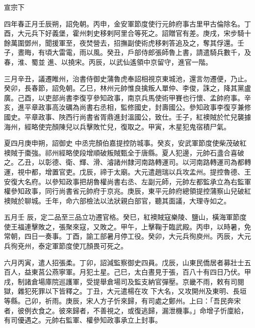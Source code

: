 
\begin{pinyinscope}

 宣宗下



 四年春正月壬辰朔，詔免朝。丙申，金安軍節度使行元帥府事古里甲古倫除名。丁酉，大元兵下好義堡，霍州刺史移剌阿里合等死之。詔贈官有差。庚戌，宋步騎十餘萬圍鄧州，聞援軍至，夜焚營去，招撫副使術虎移剌答追及之，奪其俘還。壬子，晝晦，有頃大雷電，雨以風。癸丑，戶部侍郎張師魯上書，請遣騎兵數千，及春，淮、蜀並
 進、以撓宋。丙辰，以武仙遙領中京留守，進官一階。



 三月辛丑，議遷睢州，治書侍御史蒲魯虎奉詔相視京東城池，還言勿遷便，乃止。癸卯，長春節，詔免朝。乙巳，林州元帥惟良擒叛人單仲、李俊，誅之，降其黨盧廣。己酉，以吏部尚書李復亨參知政事，南京兵馬使術甲賽也行懷、孟帥府事。辛亥，進平章政事高汝礪為尚書右丞相，監修國史，封壽國公。參知政事李復亨兼修國史。平章政事、陜西行尚書省胥鼎進封溫國公，致仕。壬子，紅襖賊於忙兒襲據海州，經略使完顏陳兒以兵擊敗忙兒，復取之。甲寅，木星犯鬼宿積尸氣。



 夏四月庚申朔，詔御史
 中丞完顏伯嘉提控防城事。癸亥，安武軍節度使柴茂破紅襖賊于棗強。祁州經略使段增順破叛賊甄全于唐縣。夏人犯邊，元帥石盞合喜破之。乙丑，以彰德、衛、輝、滑、濬諸州隸河南路轉運司。以河南路轉運司為都轉運，視中都，增置官吏。戊辰，禘于太廟。大元遣趙瑞以兵攻孟州。提控魯德、王安復大名府。以參知政事把胡魯權尚書右丞、左副元師，元帥左都監承立為右監軍權參知政事，同行尚書省元帥府于京兆。庚辰，東平元帥府總領提控蒲察山兒破紅襖賊於聊城。壬年，命六部檢法以法狀親白部官，聽其面議，大理寺如之。



 五月壬
 辰，定二品至三品立功遷官格。癸巳，紅襖賊寇樂陵、鹽山，橫海軍節度使王福連擊敗之，張聚來寇，又敗之。甲午，上擊鞠于臨武殿。丙申，以時暑，免常朝，四日一奏事。丁酉，諭工部暑月停工役。癸卯，大元兵徇庾州。丙辰，大元兵徇兗州，泰定軍節度使兀顏畏可死之。



 六月丙寅，遣人招張柔。丁卯，詔減監察御史四員。戊辰，山東民僑居者募壯士五百人，益東莒公燕寧軍。月犯土星。己巳，太白晝見于張，百八十有四日乃伏。甲戌，制諸倉場庫院巡護軍，受提舉倉場司及監支納官彈壓。京畿不雨，敕有司閱獄，雜犯死罪以下皆釋之。丁丑，大元遣楊在攻
 下大名，又攻開州及東明、長垣等縣。己卯，祈雨。庚辰，宋人方子忻來歸，有司處之鄭州。上曰：「吾民奔宋者，彼例衣食之。彼來歸者，不善視之，或復逃歸，漏泄機事。」命增子忻廩給，有司優遇之。元帥右監軍、權參知政事承立上封事。




\end{pinyinscope}
